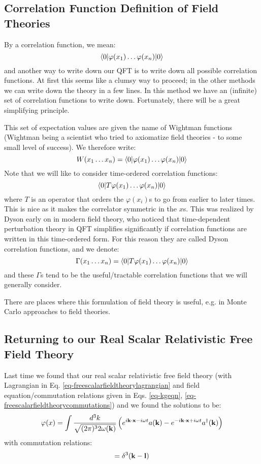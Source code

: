 \subsection{Correlation Function Definition of Field Theories}
By a correlation function, we mean:
\begin{equation}
    \bra{0}\varphi(x_1) \ldots \varphi(x_n)\ket{0}
\end{equation}
and another way to write down our QFT is to write down all possible correlation functions. At first this seems like a clumsy way to proceed; in the other methods we can write down the theory in a few lines. In this method we have an (infinite) set of correlation functions to write down. Fortunately, there will be a great simplifying principle.

This set of expectation values are given the name of Wightman functions (Wightman being a scientist who tried to axiomatize field theories - to some small level of success). We therefore write:
\begin{equation}
    W(x_1 \ldots x_n) = \bra{0}\varphi(x_1) \ldots \varphi(x_n)\ket{0}
\end{equation}
Note that we will like to consider time-ordered correlation functions:
\begin{equation}
    \bra{0}T\varphi(x_1) \ldots \varphi(x_n)\ket{0}
\end{equation}
where $T$ is an operator that orders the $\varphi(x_i)$s to go from earlier to later times. This is nice as it makes the correlator symmetric in the $x$s. This was realized by Dyson early on in modern field theory, who noticed that time-dependent perturbation theory in QFT simplifies significantly if correlation functions are written in this time-ordered form. For this reason they are called Dyson correlation functions, and we denote:
\begin{equation}
    \Gamma(x_1 \ldots x_n) = \bra{0}T\varphi(x_1) \ldots \varphi(x_n)\ket{0}
\end{equation}
and these $\Gamma$s tend to be the useful/tractable correlation functions that we will generally consider.

There are places where this formulation of field theory is useful, e.g. in Monte Carlo approaches to field theories.

\subsection{Returning to our Real Scalar Relativistic Free  Field Theory}
Last time we found that our real scalar relativistic free field theory (with Lagrangian in Eq. \eqref{eq-freescalarfieldtheorylagrangian} and field equation/commutation relations given in Eqs. \eqref{eq-kgeqn}, \eqref{eq-freescalarfieldtheorycommutations}) and we found the solutions to be:
\begin{equation}
    \varphi(x) = \int \frac{d^3k}{\sqrt{(2\pi)^3 2\omega(\v{k})}}\left(e^{i\v{k}\cdot \v{x} - i\omega t}a(\v{k}) - e^{-i\v{k}\cdot\v{x} + i\omega t}a^\dag(\v{k})\right)
\end{equation}
with commutation relations:
\begin{equation}
    [a(\v{k}), a^\dag(\v{l})] = \delta^3(\v{k} - \v{l})
\end{equation}

